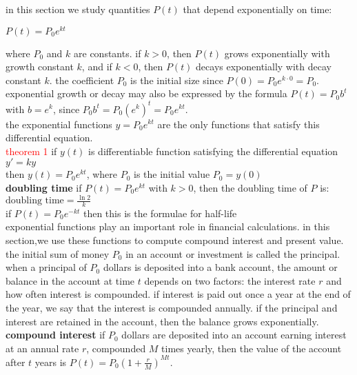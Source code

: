 \documentclass{article}
\begin{document}
in this section we study quantities $P(t)$ that depend exponentially on time:

\begin{center}$P(t) = P_0e^{kt}$\end{center}

where $P_0$ and $k$ are constants. if $k > 0$, then $P(t)$ grows exponentially with growth constant $k$, and if $k < 0$, then $P(t)$ decays exponentially with decay constant $k$. the coefficient $P_0$ is the initial size since $P(0) = P_0e^{k \cdot 0} = P_0$. exponential growth or decay may also be expressed by the formula $P(t) = P_0b^t$ with $b = e^k$, since $P_0b^t = P_0(e^k)^t = P_0e^{kt}$.\\

the exponential functions $y = P_0e^{kt}$ are the only functions that satisfy this differential equation.\\
\textcolor{red}{theorem 1} if $y(t)$ is differentiable function satisfying the differential equation\\
$y' = ky$\\
then $y(t) = P_0e^{kt}$, where $P_0$ is the initial value $P_0 = y(0)$\\

\textbf{doubling time} if $P(t) = P_0e^{kt}$ with $k > 0$, then the doubling time of $P$ is:\\
$\text{doubling time} = \frac{\ln2}{k}$\\
if $P(t) = P_0e^{-kt}$ then this is the formulae for half-life\\

exponential functions play an important role in financial calculations. in this section,we use these functions to compute compound interest and present value. the initial sum of money $P_0$ in an account or investment is called the principal. when a principal of $P_0$ dollars is deposited into a bank account, the amount or balance in the account at time $t$ depends on two factors: the interest rate $r$ and how often interest is compounded. if interest is paid out once a year at the end of the year, we say that the interest is compounded annually. if the principal and interest are retained in the account, then the balance grows exponentially.\\

\textbf{compound interest} if $P_0$ dollars are deposited into an account earning interest at an annual rate $r$, compounded $M$ times yearly, then the value of the account after $t$ years is $P(t) = P_0(1 + \frac{r}{M})^{Mt}$.\\
\end{document}

